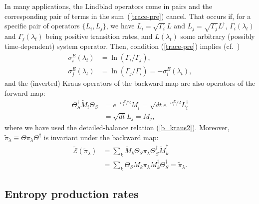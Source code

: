 \documentclass[aps,prx,twocolumn,showpacs,floatfix,superscriptaddress,graphics,longbibliography]{revtex4-1}
\newcommand{\E}{{\mathcal E}}
\newcommand{\HAT}{}
\begin{document}
In many applications, the Lindblad operators come in pairs and the corresponding pair of terms in the sum~(\ref{trace-pre}) cancel. That occurs if, for a specific pair of operators $\{\HAT{L}_i,\HAT{L}_j\}$, 
we have $\HAT{L}_i=\sqrt{\Gamma_i} \HAT{L}$ and $\HAT{L}_j =\sqrt{\Gamma_j} \HAT{L}^\dagger$,  $\Gamma_i(\lambda_t)$ and $\Gamma_j(\lambda_t)$ being positive transition rates, and 
$\HAT{L}(\lambda_t)$ some arbitrary (possibly time-dependent) system operator. Then, condition (\ref{trace-pre}) implies (cf.~\cite{JordanPRA})
\begin{align}\label{entpairs}
\sigma_{i}^E(\lambda_t) & = \ln (\Gamma_i/\Gamma_j), \\ 
\sigma_{j}^E(\lambda_t) & = \ln (\Gamma_j/\Gamma_i)= - \sigma_{i}^E(\lambda_t), \nonumber
\end{align}
and the (inverted) Kraus operators of the backward map are also operators of the forward map:
\begin{align}
\Theta_S^\dagger \tilde{M}_i \Theta_S & = e^{-\sigma_i^E/2} M_i^\dagger = \sqrt{dt} e^{-\sigma_i^E/2} L_i^\dagger \nonumber \\ 
& = \sqrt{dt} L_j = M_j, \label{mpairs}
\end{align}
where we have used the detailed-balance relation (\ref{b_kraus2}). Moreover, $\tilde{\pi}_\lambda \equiv \Theta \pi_\lambda \Theta^\dagger$  is invariant under the backward map:
\begin{align}
\tilde\E (\tilde\pi_\lambda) & = \sum_k \tilde{M}_k \Theta_S \pi_\lambda \Theta_S^\dagger \tilde{M}_k^\dagger \nonumber \\ 
& = \sum_k \Theta_S M_k \pi_\lambda M_k^\dagger \Theta_S^\dagger = \tilde{\pi}_\lambda.
\end{align}


\subsection{Entropy production rates}
\end{document}

